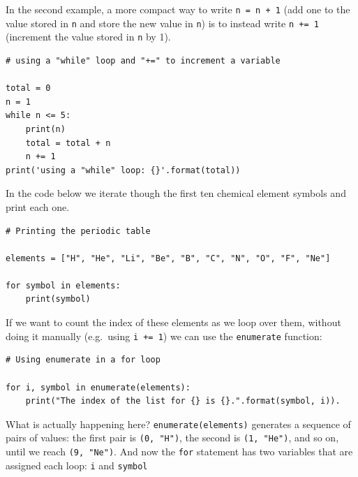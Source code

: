 \documentclass[a4paper]{article}
\begin{document}
In the second example, a more compact way to write \texttt{n = n + 1} (add one to the value stored in \texttt{n} and store the new value in \texttt{n}) is to instead write \texttt{n += 1} (increment the value stored in \texttt{n} by 1).
\begin{lstlisting}
# using a "while" loop and "+=" to increment a variable

total = 0
n = 1
while n <= 5:
    print(n)
    total = total + n
    n += 1
print('using a "while" loop: {}'.format(total))
\end{lstlisting}

In the code below we iterate though the first ten chemical element symbols and print each one.
\begin{lstlisting}
# Printing the periodic table

elements = ["H", "He", "Li", "Be", "B", "C", "N", "O", "F", "Ne"]

for symbol in elements:
	print(symbol)
\end{lstlisting}
If we want to count the index of these elements as we loop over them, without doing it manually (e.g.\ using \texttt{i += 1}) we can use the \texttt{enumerate} function:
\begin{lstlisting}
# Using enumerate in a for loop

for i, symbol in enumerate(elements):
	print("The index of the list for {} is {}.".format(symbol, i)).
\end{lstlisting}
What is actually happening here? \texttt{enumerate(elements)} generates a sequence of pairs of values: the first pair is \texttt{(0, "H")}, the second is \texttt{(1, "He")}, and so on, until we reach \texttt{(9, "Ne")}. And now the \texttt{for} statement has two variables that are assigned each loop: \texttt{i} and \texttt{symbol}

\vspace{\baselineskip}
\begin{center}
	\noindent{}
\end{center}
\end{document}
